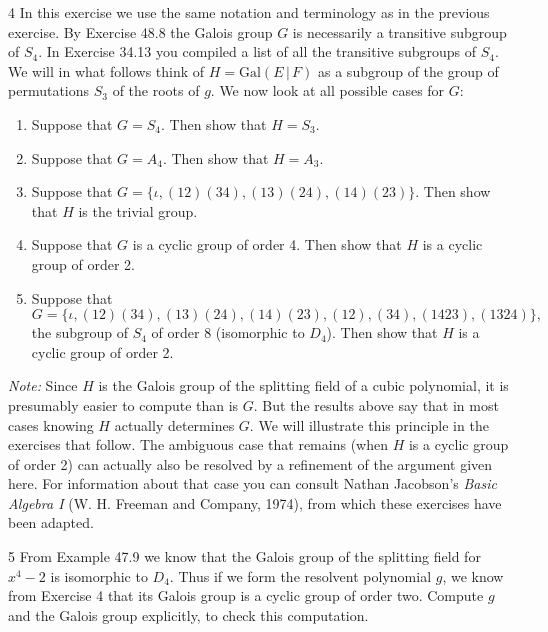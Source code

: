 \begin{problem}{4}
    In this exercise we use the same notation and terminology as in the previous exercise.
    By Exercise 48.8 the Galois group $G$ is necessarily a transitive subgroup of $S_4$.
    In Exercise 34.13 you compiled a list of all the transitive subgroups of $S_4$. We will
    in what follows think of $H = \mathrm{Gal}(E \,|\, F)$ as a subgroup of the group of
    permutations $S_3$ of the roots of $g$. We now look at all possible cases for $G$:
    \begin{enumerate}
        \item[(a)] Suppose that $G = S_4$. Then show that $H = S_3$.
        \item[(b)] Suppose that $G = A_4$. Then show that $H = A_3$.
        \item[(c)] Suppose that $G = \{\iota, (12)(34), (13)(24), (14)(23)\}$. Then show
        that $H$ is the trivial group.
        \item[(d)] Suppose that $G$ is a cyclic group of order 4. Then show that $H$ is a
        cyclic group of order 2.
        \item[(e)] Suppose that
        \[G = \{\iota, (12)(34), (13)(24), (14)(23), (12), (34), (1423), (1324)\},\]
        the subgroup of $S_4$ of order 8 (isomorphic to $D_4$). Then show that $H$ is a
        cyclic group of order 2.
    \end{enumerate}
    \emph{Note:} Since $H$ is the Galois group of the splitting field of a cubic
    polynomial, it is presumably easier to compute than is $G$. But the results above say
    that in most cases knowing $H$ actually determines $G$. We will illustrate this
    principle in the exercises that follow. The ambiguous case that remains (when $H$ is a
    cyclic group of order 2) can actually also be resolved by a refinement of the argument
    given here. For information about that case you can consult Nathan Jacobson's
    \emph{Basic Algebra I} (W. H. Freeman and Company, 1974), from which these exercises
    have been adapted.
\end{problem}
\unsolved

\begin{problem}{5}
    From Example 47.9 we know that the Galois group of the splitting field for $x^4 - 2$
    is isomorphic to $D_4$. Thus if we form the resolvent polynomial $g$, we know from
    Exercise 4 that its Galois group is a cyclic group of order two. Compute $g$ and the
    Galois group explicitly, to check this computation.
\end{problem}
\unsolved

